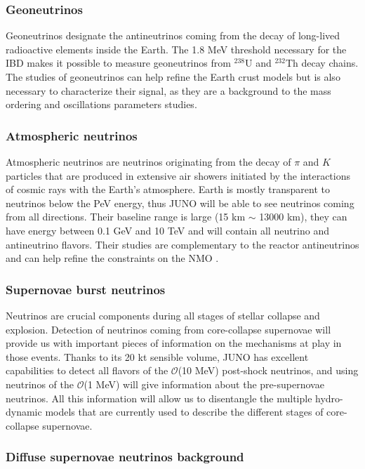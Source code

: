 \documentclass[../main.tex]{subfiles}
\begin{document}
\subsubsection{Geoneutrinos}

Geoneutrinos designate the antineutrinos coming from the decay of long-lived radioactive elements inside the Earth. The 1.8 MeV threshold necessary for the IBD makes it possible to measure geoneutrinos from $^{238}$U and $^{232}$Th decay chains. The studies of geoneutrinos can help refine the Earth crust models but is also necessary to characterize their signal, as they are a background to the mass ordering and oscillations parameters studies.

\subsubsection{Atmospheric neutrinos}

Atmospheric neutrinos are neutrinos originating from the decay of $\pi$ and $K$ particles that are produced in extensive air showers initiated by the interactions of cosmic rays with the Earth's atmosphere. Earth is mostly transparent to neutrinos below the PeV energy, thus JUNO will be able to see neutrinos coming from all directions. Their baseline range is large (15 km $\sim$ 13000 km), they can have energy between 0.1 GeV and 10 TeV and will contain all neutrino and antineutrino flavors. Their studies are complementary to the reactor antineutrinos and can help refine the constraints on the NMO \cite{an_neutrino_2016}.

\subsubsection{Supernovae burst neutrinos}

Neutrinos are crucial components during all stages of stellar collapse and explosion. Detection of neutrinos coming from core-collapse supernovae will provide us with important pieces of information on the mechanisms at play in those events.
Thanks to its 20 kt sensible volume, JUNO has excellent capabilities to detect all flavors of the $\mathcal{O}$(10 MeV) post-shock neutrinos, and using neutrinos of the $\mathcal{O}$(1 MeV) will give information about the pre-supernovae neutrinos. All this information will allow us to disentangle the multiple hydro-dynamic models that are currently used to describe the different stages of core-collapse supernovae.

\subsubsection{Diffuse supernovae neutrinos background}
\end{document}
